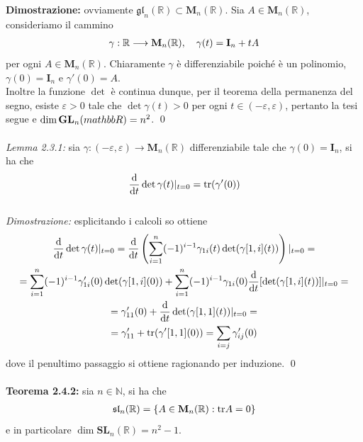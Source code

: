 \documentclass{article}
\begin{document}
\textbf{Dimostrazione:} ovviamente $\mathfrak{gl}_n(\mathbb{R}) \subset \mathbf{M}_n(\mathbb{R})$. Sia $A \in \mathbf{M}_n(\mathbb{R})$, consideriamo il cammino
\begin{gather}
    \gamma : \mathbb{R} \longrightarrow \mathbf{M}_n(\mathbb{R}), \quad \gamma(t) = \mathbf{I}_n + tA \notag
\end{gather}
per ogni $A \in \mathbf{M}_n(\mathbb{R})$. Chiaramente $\gamma$ è differenziabile poiché è un polinomio,  $\gamma(0) = \mathbf{I}_n$ e $\gamma'(0) = A$. \\
Inoltre la funzione $\det$ è continua dunque, per il teorema della permanenza del segno, esiste $\varepsilon > 0$ tale che $\det \gamma(t) > 0$ per ogni $t \in (-\varepsilon, \varepsilon)$, pertanto la tesi segue e $\dim \mathbf{GL}_n(\\mathbb{R}) = n^2$. \qed \\ \\
\textit{Lemma 2.3.1:} sia $\gamma : (-\varepsilon, \varepsilon) \longrightarrow \mathbf{M}_n(\mathbb{R})$ differenziabile tale che $\gamma(0) = \mathbf{I}_n$, si ha che
\begin{gather}
    \frac{\mathrm{d}}{\mathrm{d}t} \det \gamma(t) |_{t = 0} = \mathrm{tr}(\gamma'(0)) \notag
\end{gather} \\

\textit{Dimostrazione:} esplicitando i calcoli so ottiene
\begin{gather}
    \frac{\mathrm{d}}{\mathrm{d}t} \det \gamma(t)|_{t = 0} = \frac{\mathrm{d}}{\mathrm{d}t} \left( \sum_{i = 1}^n (-1)^{i - 1} \gamma_{1i}(t) \det(\gamma[1, i](t)) \right)|_{t = 0} = \notag \\
    = \sum_{i = 1}^n (-1)^{i - 1}\gamma'_{1i}(0) \det(\gamma[1,i](0)) + \sum_{i = 1}^n (-1)^{i - 1} \gamma_{1i}(0) \frac{\mathrm{d}}{\mathrm{d}t} [\det (\gamma[1, i](t))]|_{t = 0} = \notag \\
    = \gamma'_{11}(0) + \frac{\mathrm{d}}{\mathrm{d}t} \det(\gamma[1, 1](t))|_{t = 0} = \notag \\
    = \gamma'_{11} + \mathrm{tr}(\gamma'[1,1](0)) = \sum_{i = j} \gamma'_{ij}(0) \notag
\end{gather}
dove il penultimo passaggio si ottiene ragionando per induzione. \qed \\ \\
\textbf{Teorema 2.4.2:} sia $n \in \mathbb{N}$, si ha che
\begin{gather}
    \mathfrak{sl}_n(\mathbb{R}) = \{ A \in \mathbf{M}_n(\mathbb{R}) : \mathrm{tr} A = 0 \} \notag
\end{gather}
e in particolare $\dim \mathbf{SL}_n(\mathbb{R}) = n^2 - 1$. \\
\end{document}
